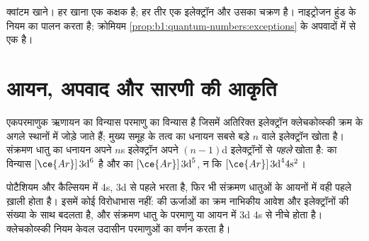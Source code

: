 \begin{omfigure}

{\small क्वांटम खाने। हर खाना एक कक्षक है; हर तीर एक इलेक्ट्रॉन
और उसका चक्रण है। नाइट्रोजन हुंड के नियम का पालन करता है; क्रोमियम
\cref{prop:b1:quantum-numbers:exceptions} के अपवादों में से एक है।}
\end{omfigure}

\section{आयन, अपवाद और सारणी की आकृति}

\begin{proposition}[आयनों के विन्यास]\label{prop:b1:quantum-numbers:ions}
एकपरमाणुक ऋणायन का विन्यास परमाणु का विन्यास है जिसमें अतिरिक्त
इलेक्ट्रॉन क्लेचकोव्स्की क्रम के अगले स्थानों में जोड़े जाते हैं; मुख्य समूह के
तत्व का धनायन सबसे बड़े $n$ वाले इलेक्ट्रॉन खोता है। संक्रमण धातु का धनायन
अपने $n$s इलेक्ट्रॉन अपने
$(n-1)$d इलेक्ट्रॉनों से \emph{पहले} खोता है:  का विन्यास $[\ce{Ar}]\,3\text{d}^6$ है और
 का $[\ce{Ar}]\,3\text{d}^5$, न कि $[\ce{Ar}]\,3\text{d}^4
4\text{s}^2$।
\end{proposition}
\admitted

\begin{remark}[भरने का क्रम हटाने का क्रम नहीं है]\label{rem:b1:quantum-numbers:order}
पोटैशियम और कैल्सियम में 4s, 3d से पहले भरता है, फिर भी संक्रमण धातुओं के
आयनों में वही पहले ख़ाली होता है। इसमें कोई विरोधाभास नहीं:  की
ऊर्जाओं का क्रम नाभिकीय आवेश और इलेक्ट्रॉनों की संख्या के साथ बदलता है, और
संक्रमण धातु के परमाणु या आयन में 3d  4s से नीचे होता है। क्लेचकोव्स्की
नियम केवल उदासीन परमाणुओं का वर्णन करता है।
\end{remark}

